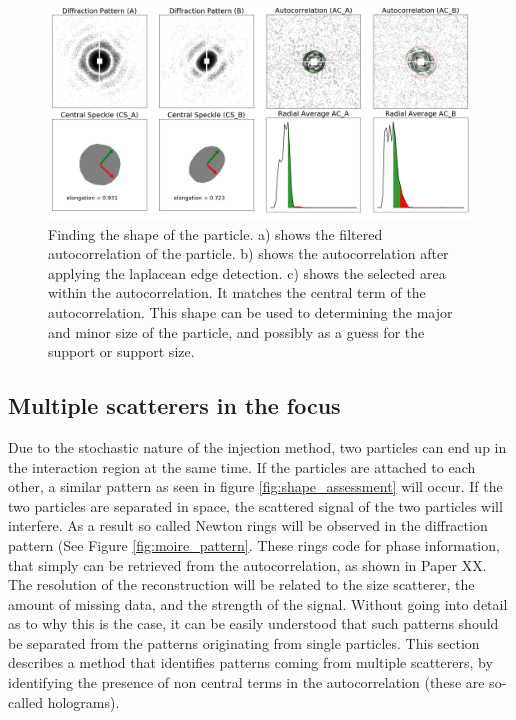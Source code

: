 \begin{figure}[h]
\centering
\includegraphics[width=120mm]{Chapter_08_ImageClassification_shape_assessment.png}
\caption{Finding the shape of the particle. a) shows the filtered autocorrelation of the particle. b) shows the autocorrelation after applying the laplacean edge detection. c) shows the selected area within the autocorrelation. It matches the central term of the autocorrelation. This shape can be used to determining the major and minor size of the particle, and possibly as a guess for the support or support size. }\label{fig:detailed_shape_assessment}
\end{figure}


\subsection{Multiple scatterers in the focus}

Due to the stochastic nature of the injection method, two particles can end up in the interaction region at the same time. If the particles are attached to each other, a similar pattern as seen in figure \ref{fig:shape_assessment} will occur. If the two particles are separated in space, the scattered signal of the two particles will interfere. As a result so called Newton rings will be observed in the diffraction pattern (See Figure \ref{fig:moire_pattern}. These rings code for phase information, that simply can be retrieved from the autocorrelation, as shown in Paper XX. The resolution of the reconstruction will be related to the size scatterer, the amount of missing data, and the strength of the signal. Without going into detail as to why this is the case, it can be easily understood that such patterns should be separated from the patterns originating from single particles. This section describes a method that identifies patterns coming from multiple scatterers, by identifying the presence of non central terms in the autocorrelation (these are so-called holograms). 

